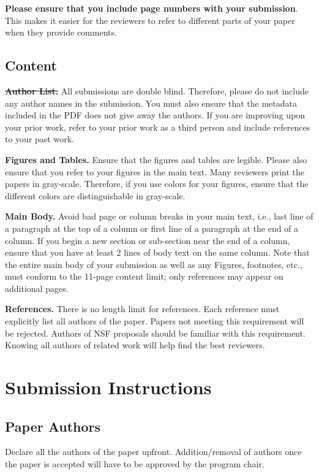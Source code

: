 \documentclass[pageno]{jpaper}
\begin{document}
\textbf{Please ensure that you include page numbers with your
submission}. This makes it easier for the reviewers to refer to
different parts of your paper when they provide comments.

\subsection{Content}

\noindent\textbf{\sout{Author List.}} All submissions are double
blind. Therefore, please do not include any author names in the
submission. You must also ensure that the metadata included in the
PDF does not give away the authors. If you are improving upon your
prior work, refer to your prior work as a third person and include
references to your past work. 

\noindent\textbf{Figures and Tables.} Ensure that the figures and
tables are legible.  Please also ensure that you refer to your
figures in the main text. Many reviewers print the papers in
gray-scale. Therefore, if you use colors for your figures, ensure
that the different colors are distinguishable in gray-scale.

\noindent\textbf{Main Body.} Avoid bad page or column breaks in
your main text, i.e., last line of a paragraph at the top of a
column or first line of a paragraph at the end of a column. If you
begin a new section or sub-section near the end of a column,
ensure that you have at least 2 lines of body text on the same
column. Note that the entire main body of your submission as well as any
Figures, footnotes, etc., must conform to the 11-page content limit;
only references may appear on additional pages.

\noindent\textbf{References.} There is no length limit for references. 
Each reference must explicitly list all authors of the paper. 
Papers not meeting this requirement will be rejected. Authors of NSF 
proposals should be familiar with this requirement. Knowing all
authors of related work will help find the best reviewers.

\section{Submission Instructions}

\subsection{Paper Authors}

Declare all the authors of the paper upfront. Addition/removal of authors once
the paper is accepted will have to be approved by the program chair.
\end{document}
